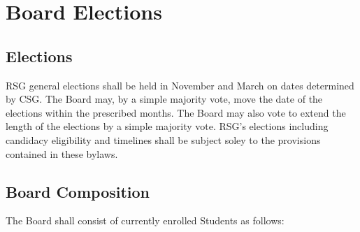 \chapter{Board Elections}
\section{Elections} RSG general elections shall be held in November and March on 
dates determined by CSG. The Board may, by a simple majority vote, move the 
date of the elections within the prescribed months. The Board may also vote to 
extend the length of the elections by a simple majority vote. RSG's elections
including candidacy eligibility and timelines shall be subject soley to the provisions contained in these bylaws.

\section{Board Composition} The Board shall consist of currently enrolled Students 
as follows:
